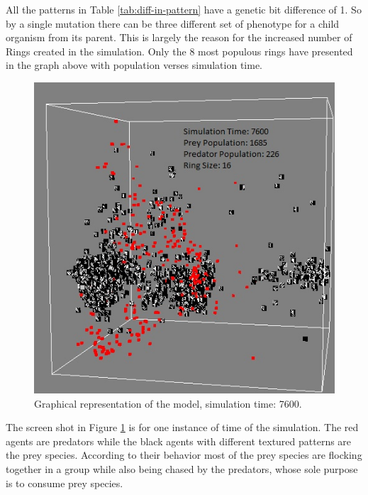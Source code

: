 All the patterns in Table \ref{tab:diff-in-pattern} have a genetic bit difference of 1. So by a single mutation there can be three different set of phenotype for a child organism from its parent. This is largely the reason for the increased number of Rings created in the simulation. Only the 8 most populous rings have presented in the graph above with population verses simulation time.

\begin{figure}[H]
	\centering
	\label{fig:screenshot-simTime7600-2-prey}
	\includegraphics[scale=0.55]{images/simTime7600}
	\caption{Graphical representation of the model, simulation time: 7600.}
\end{figure}

The screen shot in Figure \ref{fig:screenshot-simTime7600-2-prey} is for one instance of time of the simulation. The red agents are predators while the black agents with different textured patterns are the prey species. According to their behavior most of the prey species are flocking together in a group while also being chased by the predators, whose sole purpose is to consume prey species. 

